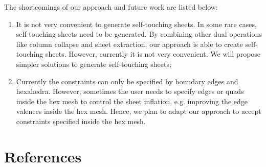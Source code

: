 \documentclass[final,5p,times,twocolumn]{elsarticle}
\begin{document}
The shortcomings of our approach and future work are listed below:
\begin{enumerate}
  \item It is not very convenient to generate self-touching sheets. In some rare cases, self-touching sheets need to be generated. By combining other dual operations like column collapse and sheet extraction, our approach is able to create self-touching sheets. However, currently it is not very convenient. We will propose simpler solutions to generate self-touching sheets;
  \item Currently the constraints can only be specified by boundary edges and hexahedra. However, sometimes the user needs to specify edges or quads inside the hex mesh to control the sheet inflation, e.g. improving the edge valences inside the hex mesh. Hence, we plan to adapt our approach to accept constraints specified inside the hex mesh.
\end{enumerate}

\section*{References}


\end{document}
